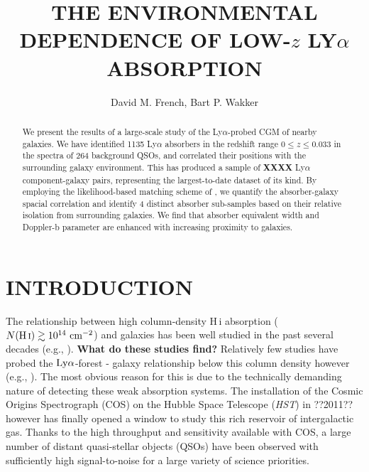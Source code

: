\documentclass[twocolumn,tighten]{aastex62}
\newcommand{\HI}{\mbox{H\,{\sc i}} }
\begin{document}
\title{THE ENVIRONMENTAL DEPENDENCE OF LOW-$z$ LY$\alpha$ ABSORPTION}



\author{David M. French, Bart P. Wakker}


\begin{abstract}
We present the results of a large-scale study of the Ly$\alpha$-probed CGM of nearby galaxies. We have identified 1135 Ly$\alpha$ absorbers in the redshift range $0 \leq z \leq 0.033$ in the spectra of 264 background QSOs, and correlated their positions with the surrounding galaxy environment. This has produced a sample of \textbf{XXXX} Ly$\alpha$ component-galaxy pairs, representing the largest-to-date dataset of its kind. By employing the likelihood-based matching scheme of \cite{french2017}, we quantify the absorber-galaxy spacial correlation and identify 4 distinct absorber sub-samples based on their relative isolation from surrounding galaxies. We find that absorber equivalent width and Doppler-b parameter are enhanced with increasing proximity to galaxies.

\end{abstract}




\section{INTRODUCTION}

The relationship between high column-density \HI absorption ($N(\HI) \gtrsim 10^{14} ~\rm cm^{-2}$) and galaxies has been well studied in the past several decades (e.g., \citealt{lanzetta1995, bowen1998, bowen2002, chen2003, chen2008, steidel2010, prochaska2011b}). \textbf{What do these studies find?} Relatively few studies have probed the $\rm Ly\alpha$-forest - galaxy relationship below this column density however (e.g., \citealt{wakker2009, french2017, bowen2002}). The most obvious reason for this is due to the technically demanding nature of detecting these weak absorption systems. The installation of the Cosmic Origins Spectrograph (COS) on the Hubble Space Telescope (\emph{HST}) in ??2011?? however has finally opened a window to study this rich reservoir of intergalactic gas.  Thanks to the high throughput and sensitivity available with COS, a large number of distant quasi-stellar objects (QSOs) have been observed with sufficiently high signal-to-noise for a large variety of science priorities. 
\end{document}
